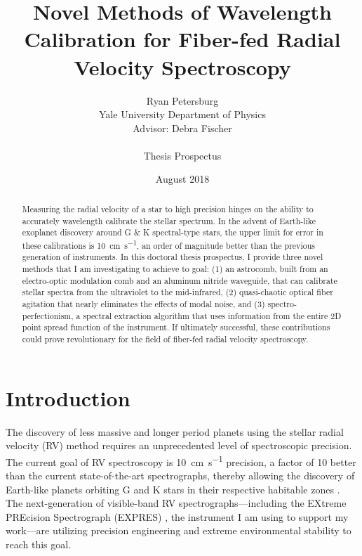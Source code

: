 \documentclass[11pt]{article}
\title{Novel Methods of Wavelength Calibration for Fiber-fed Radial Velocity Spectroscopy}
\author{Ryan Petersburg\\
Yale University Department of Physics\\
Advisor: Debra Fischer\\
\\
Thesis Prospectus}
\date{August 2018}
\begin{document}
\maketitle

\begin{abstract}

Measuring the radial velocity of a star to high precision hinges on the ability to accurately wavelength calibrate the stellar spectrum. In the advent of Earth-like exoplanet discovery around G \& K spectral-type stars, the upper limit for error in these calibrations is \SI{10}{\centi\meter\per\second}, an order of magnitude better than the previous generation of instruments. In this doctoral thesis prospectus, I provide three novel methods that I am investigating to achieve to goal: (1) an astrocomb, built from an electro-optic modulation comb and an aluminum nitride waveguide, that can calibrate stellar spectra from the ultraviolet to the mid-infrared, (2) quasi-chaotic optical fiber agitation that nearly eliminates the effects of modal noise, and (3) spectro-perfectionism, a spectral extraction algorithm that uses information from the entire 2D point spread function of the instrument. If ultimately successful, these contributions could prove revolutionary for the field of fiber-fed radial velocity spectroscopy.

\end{abstract}

\pagebreak

\section{Introduction}

The discovery of less massive and longer period planets using the stellar radial velocity (RV) method requires an unprecedented level of spectroscopic precision. The current goal of RV spectroscopy is \SI{10}{\centi\meter\per\second} precision, a factor of 10 better than the current state-of-the-art spectrographs, thereby allowing the discovery of Earth-like planets orbiting G and K stars in their respective habitable zones \citep{Fischer2016}. The next-generation of visible-band RV spectrographs---including the EXtreme PREcision Spectrograph (EXPRES) \citep{Jurgenson2016}, the instrument I am using to support my work---are utilizing precision engineering and extreme environmental stability to reach this goal.
\end{document}
